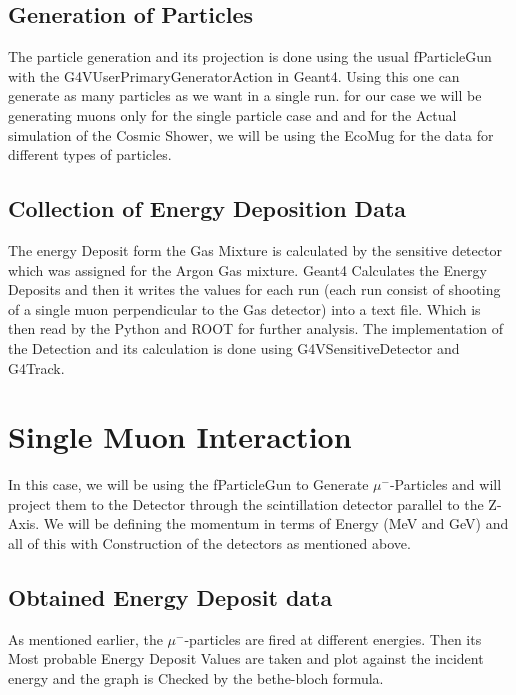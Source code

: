 \documentclass{article}
\begin{document}
\begin{multicols}{2}
\subsection{Generation of Particles}

The particle generation and its projection is done using the
usual fParticleGun with the G4VUserPrimaryGeneratorAction in Geant4.
Using this one can generate as many particles as we want in a single run.
for our case we will be generating muons only for the single particle case and
and for the Actual simulation of the Cosmic Shower, we will be using the
EcoMug for the data for different types of particles.




\subsection{Collection of Energy Deposition Data}
The energy Deposit form the Gas Mixture is calculated by the 
sensitive detector which was assigned for the Argon Gas mixture.
Geant4 Calculates the Energy Deposits and then it writes the values
for each run (each run consist of shooting of a single muon perpendicular to the 
Gas detector) into a text file. Which is then read by the Python and ROOT for further analysis.
The implementation  of the Detection and its calculation is 
done using G4VSensitiveDetector and G4Track.





\section{Single Muon Interaction}

In this case, we will be using the fParticleGun to Generate $\mu^-$-Particles 
and will project them to the Detector through the scintillation detector 
parallel to the Z-Axis. We will be defining the momentum in terms of Energy (MeV and GeV) and all of this
with Construction of the detectors as mentioned above. 


\subsection{Obtained Energy Deposit data}

As mentioned earlier, the $\mu^-$-particles are fired at different
energies. Then its Most probable Energy Deposit Values are taken 
and plot against the incident energy and the graph is Checked by the
bethe-bloch formula.



\end{multicols}
\end{document}
